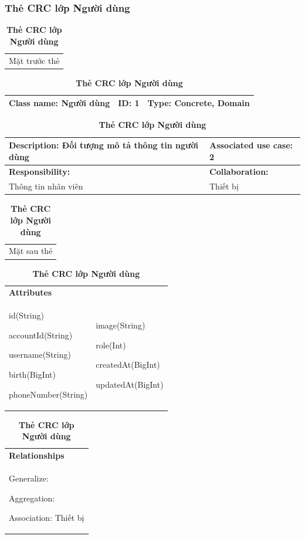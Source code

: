 \subsubsection{Thẻ CRC lớp Người dùng}
  \begin{table}[H]
    \caption{\bfseries \fontsize{12pt}{0pt}\selectfont Thẻ CRC lớp Người dùng}
    \centering
    \begin{tabularx}{0.9\textwidth}{X}
      Mặt trước thẻ
    \end{tabularx}
    \begin{tabularx}{0.9\textwidth}{|X|X|X|}
      \hline
      \textbf{Class name:} Người dùng & \textbf{ID:} 1 & \textbf{Type:} Concrete, Domain \\
      \hline
    \end{tabularx}
    \begin{tabularx}{0.9\textwidth}{|X|X|}
      \textbf{Description:} Đối tượng mô tả thông tin người dùng & \textbf{Associated use case:} 2 \\
      \hline
      \textbf{Responsibility:} & \textbf{Collaboration:} \\
      Thông tin nhân viên 
      & 
      Thiết bị 
      \\
      \hline
    \end{tabularx}
    \begin{tabularx}{0.9\textwidth}{X}
      Mặt sau thẻ
    \end{tabularx}
    \begin{tabularx}{0.9\textwidth}{|X|X|}
      \hline
      \textbf{Attributes} & \\
      id(String) 
      
      accountId(String)

      username(String)

      birth(BigInt)

      phoneNumber(String)
      & 
      image(String) 
      
      role(Int) 
      
      createdAt(BigInt)

      updatedAt(BigInt)
      \\
      \hline
    \end{tabularx}
    \begin{tabularx}{0.9\textwidth}{|X|}
      \textbf{Relationships} \\
      Generalize:  

      Aggregation:  
      
      Association: Thiết bị 
      \\
      \hline
    \end{tabularx}
  \end{table}

